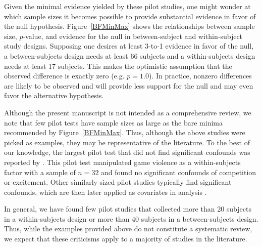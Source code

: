 \documentclass[man]{apa6}
\begin{document}
Given the minimal evidence yielded by these pilot studies, one might wonder at which sample sizes it becomes possible to provide substantial evidence in favor of the null hypothesis. 
Figure~\ref{BFMinMax} shows the relationships between sample size, $p$-value, and evidence for the null in between-subject and within-subject study designs. Supposing one desires at least 3-to-1 evidence in favor of the null, a between-subjects design needs at least 66 subjects and a within-subjects design needs at least 17 subjects. This makes the optimistic assumption that the observed difference is exactly zero (e.g. $p = 1.0$). In practice, nonzero differences are likely to be observed and will provide less support for the null and may even favor the alternative hypothesis. 

Although the present manuscript is not intended as a comprehensive review, we note that few pilot tests have sample sizes as large as the bare minima recommended by Figure~\ref{BFMinMax}. Thus, although the above studies were picked as examples, they may be representative of the literature. 
To the best of our knowledge, the largest pilot test that did not find significant confounds was reported by \citet{Anderson:Carnagey:2009}. This pilot test manipulated game violence as a within-subjects factor with a sample of $n=32$ and found no significant confounds of competition or excitement. Other similarly-sized pilot studies typically find significant confounds, which are then later applied as covariates in analysis \citep[e.g.,][]{Anderson:Dill:2000, Gitter:etal:2013}.

In general, we have found few pilot studies that collected more than 20 subjects in a within-subjects design or more than 40 subjects in a between-subjects design. Thus, while the examples provided above do not constitute a systematic review, we expect that these criticisms apply to a majority of studies in the literature.


\end{document}
